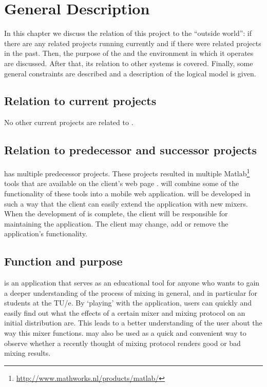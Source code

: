 \chapter{General Description}
\label{chap:gendesc}
In this chapter we discuss the relation of this project to the ``outside world'': if there are any related projects running currently and if there were related projects in the past. Then, the purpose of the \applicationname{} and the environment in which it operates are discussed. After that, its relation to other systems is covered. Finally, some general constraints are described and a description of the logical model is given.

\section{Relation to current projects}
\label{sec:curproj}
No other current projects are related to \projectname{}.

\section{Relation to predecessor and successor projects}
\label{sec:predsuc}
\projectname{} has multiple predecessor projects. These projects resulted in multiple Matlab\footnote{\url{http://www.mathworks.nl/products/matlab/}} tools that are available on the client's web page \cite{clientpage}. \projectname{} will combine some of the functionality of these tools into a mobile web application. \projectname{} will be developed in such a way that the client can easily extend the application with new mixers. When the development of \projectname{} is complete, the client will be responsible for maintaining the application. The client may change, add or remove the application's functionality.

\section{Function and purpose}
\label{sec:functpurp}
\projectname{} is an application that serves as an educational tool for anyone who wants to gain a deeper understanding of the process of mixing in general, and in particular for students at the TU/e. By `playing' with the application, users can quickly and easily find out what the effects of a certain mixer and mixing protocol on an initial distribution are. This leads to a better understanding of the user about the way this mixer functions. \projectname{} may also be used as a quick and convenient way to observe whether a recently thought of mixing protocol renders good or bad mixing results. 

